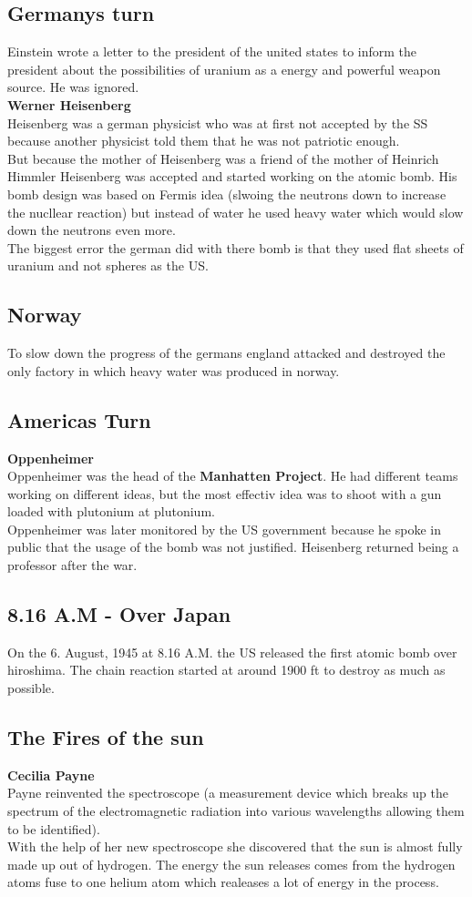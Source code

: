 \documentclass{article}
\begin{document}
\subsection{Germanys turn}
Einstein wrote a letter to the president of the united states to inform the president about the possibilities of uranium as a energy and powerful weapon source. He was ignored.\\
\textbf{Werner Heisenberg} \\
Heisenberg was a german physicist who was at first not accepted by the SS because another physicist told them that he was not patriotic enough. \\
But because the mother of Heisenberg was a friend of the mother of Heinrich Himmler Heisenberg was accepted and started working on the atomic bomb. His bomb design was based on Fermis idea (slwoing the neutrons down to increase the nucllear reaction) but instead of water he used heavy water which would slow down the neutrons even more. \\
The biggest error the german did with there bomb is that they used flat sheets of uranium and not spheres as the US.
\subsection{Norway}
To slow down the progress of the germans england attacked and destroyed the only factory in which heavy water was produced in norway.
\subsection{Americas Turn}
\textbf{Oppenheimer}\\
Oppenheimer was the head of the \textbf{Manhatten Project}. He had different teams working on different ideas, but the most effectiv idea was to shoot with a gun loaded with plutonium at plutonium.\\
Oppenheimer was later monitored by the US government because he spoke in public that the usage of the bomb was not justified. Heisenberg returned being a professor after the war.
\subsection{8.16 A.M - Over Japan}
On the 6. August, 1945 at 8.16 A.M. the US released the first atomic bomb over hiroshima. The chain reaction started at around 1900 ft to destroy as much as possible.
\subsection{The Fires of the sun}
\textbf{Cecilia Payne}\\
Payne reinvented the spectroscope (a measurement device which breaks up the spectrum of the electromagnetic radiation into various wavelengths allowing them to be identified). \\
With the help of her new spectroscope she discovered that the sun is almost fully made up out of hydrogen. The energy the sun releases comes from the hydrogen atoms fuse to one helium atom which realeases a lot of energy in the process.
\end{document}
